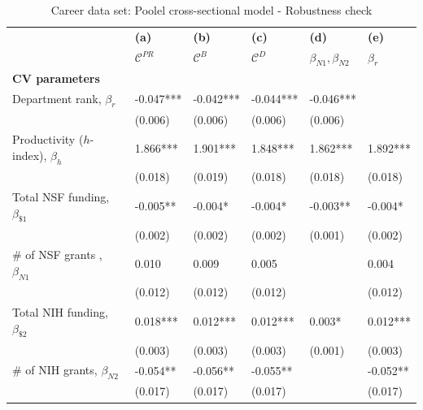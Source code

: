 \documentclass[10pt]{article}          %
\begin{document}
\begin{table}[h]
\caption{Career data set: Poolel cross-sectional model - Robustness check}
\begin{tabular}{m{5cm} p{2.1cm} p{2.1cm} p{2.1cm} p{2.1cm} p{2.1cm} }
\\
\hline
\hline
& \textbf{(a)} & \textbf{(b)} & \textbf{(c)} & \textbf{(d)} & \textbf{(e)} \\
& {$\mathscr{C}^{PR}$} & {$\mathscr{C}^{B}$} & {$\mathscr{C}^{D}$} & \sout{$\beta_{N1}, \beta_{N2}$} & \sout{$\beta_{r}$} \\ \hline

\multicolumn{6}{l}{\textbf{CV parameters}} \\
\rowcolor{lightgray}
{Department rank, $\beta_r$}          & -0.047*** & -0.042*** & -0.044*** & -0.046*** &           \\
                                      & (0.006)   & (0.006)   & (0.006)   & (0.006)   &           \\
\rowcolor{lightgray}                               
{Productivity ($h$-index), $\beta_h$} & 1.866***  & 1.901***  & 1.848***  & 1.862***  & 1.892***  \\
                                      & (0.018)   & (0.019)   & (0.018)   & (0.018)   & (0.018)   \\
\rowcolor{lightgray}
{Total NSF funding, $\beta_{\$1}$}    & -0.005**  & -0.004*   & -0.004*   & -0.003**  & -0.004*   \\
                                      & (0.002)   & (0.002)   & (0.002)   & (0.001)   & (0.002)   \\
\rowcolor{lightgray}
{\# of NSF grants , $\beta_{N1}$}     & 0.010     & 0.009     & 0.005     &           & 0.004     \\
                                      & (0.012)   & (0.012)   & (0.012)   &           & (0.012)   \\
\rowcolor{lightgray}
{Total NIH funding, $\beta_{\$2}$}    & 0.018***  & 0.012***  & 0.012***  & 0.003*    & 0.012***  \\
                                      & (0.003)   & (0.003)   & (0.003)   & (0.001)   & (0.003)   \\
\rowcolor{lightgray}
{\# of NIH grants, $\beta_{N2}$}      & -0.054**  & -0.056**  & -0.055**  &           & -0.052**  \\
                                      & (0.017)   & (0.017)   & (0.017)   &           & (0.017)   \\ \hline


\end{tabular}
\end{table}
\end{document}
